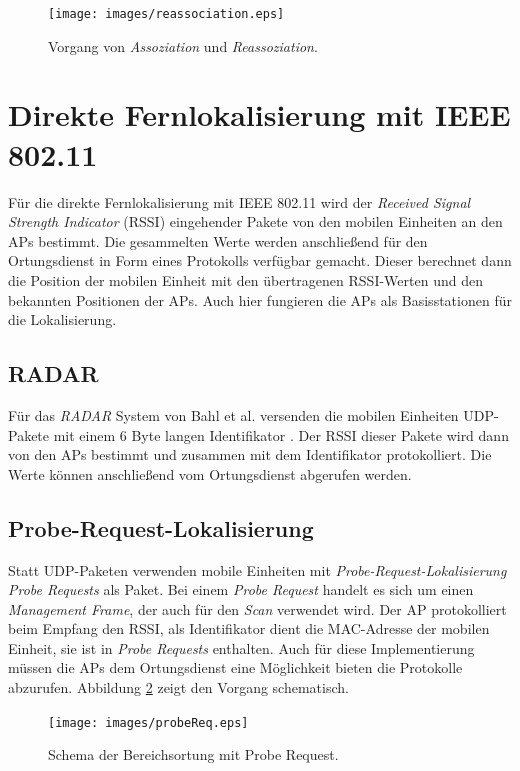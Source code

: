 \begin{figure}[h!]
  \centering
	\texttt{[image: images/reassociation.eps]}
  \caption{Vorgang von \emph{Assoziation} und \emph{Reassoziation}.}
  \label{fig:reassociation}
\end{figure}

\section{Direkte Fernlokalisierung mit IEEE 802.11}
Für die direkte Fernlokalisierung mit IEEE 802.11 wird der \emph{Received Signal Strength Indicator} (RSSI) eingehender Pakete von den mobilen Einheiten an den APs bestimmt.
Die gesammelten Werte werden anschließend für den Ortungsdienst in Form eines Protokolls verfügbar gemacht.
Dieser berechnet dann die Position der mobilen Einheit mit den übertragenen RSSI-Werten und den bekannten Positionen der APs.
Auch hier fungieren die APs als Basisstationen für die Lokalisierung.

\subsection{RADAR}
Für das \emph{RADAR} System von Bahl et al. versenden die mobilen Einheiten UDP-Pakete mit einem 6 Byte langen Identifikator \cite{bahl2000radar}.
Der RSSI dieser Pakete wird dann von den APs bestimmt und zusammen mit dem Identifikator protokolliert.
Die Werte können anschließend vom Ortungsdienst abgerufen werden. 

\subsection{Probe-Request-Lokalisierung}
Statt UDP-Paketen verwenden mobile Einheiten mit \emph{Probe-Request-Lokalisierung} \emph{Probe Requests} als Paket.
Bei einem \emph{Probe Request} handelt es sich um einen \emph{Management Frame}, der auch für den \emph{Scan} verwendet wird.
Der AP protokolliert beim Empfang den RSSI, als Identifikator dient die MAC-Adresse der mobilen Einheit, sie ist in \emph{Probe Requests} enthalten.
Auch für diese Implementierung müssen die APs dem Ortungsdienst eine Möglichkeit bieten die Protokolle abzurufen.
Abbildung \ref{fig:probeReq} zeigt den Vorgang schematisch.

\begin{figure}[h]
  \centering
	\texttt{[image: images/probeReq.eps]}
  \caption{Schema der Bereichsortung mit Probe Request.}
  \label{fig:probeReq}
\end{figure}


